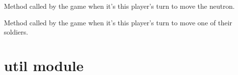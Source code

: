 \documentclass[letterpaper,10pt,english,openany,oneside]{sphinxmanual}
\begin{document}
\begin{fulllineitems}

\begin{fulllineitems}
\label{\detokenize{player:player.StrategyPlayer.move_neutron}}
Method called by the game when it’s this player’s turn to move the
neutron.

\end{fulllineitems}


\begin{fulllineitems}
\label{\detokenize{player:player.StrategyPlayer.move_soldier}}
Method called by the game when it’s this player’s turn to move one of
their soldiers.

\end{fulllineitems}


\end{fulllineitems}



\section{util module}
\label{\detokenize{util:module-util}}\label{\detokenize{util:util-module}}\label{\detokenize{util::doc}}
\end{document}

